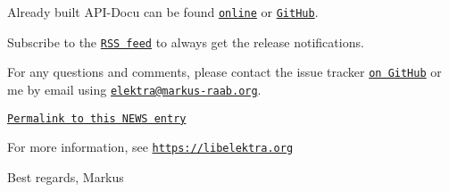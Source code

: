 Already built A\+P\+I-\/\+Docu can be found \href{https://doc.libelektra.org/api/0.8.20/html/}{\tt online} or \href{https://github.com/ElektraInitiative/doc/tree/master/api/0.8.20}{\tt Git\+Hub}.

Subscribe to the \href{https://www.libelektra.org/news/feed.rss}{\tt R\+SS feed} to always get the release notifications.

For any questions and comments, please contact the issue tracker \href{http://issues.libelektra.org}{\tt on Git\+Hub} or me by email using \href{mailto:elektra@markus-raab.org}{\tt elektra@markus-\/raab.\+org}.

\href{https://www.libelektra.org/news/0.8.20-release}{\tt Permalink to this N\+E\+WS entry}

For more information, see \href{https://libelektra.org}{\tt https\+://libelektra.\+org}

Best regards, Markus 